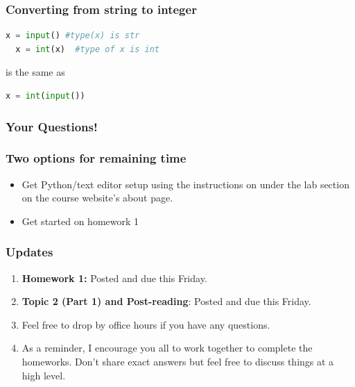 \documentclass{beamer}
\begin{document}
%
%
%
\begin{frame}[fragile]
  \frametitle{Converting from string to integer}
  \begin{lstlisting}[language=Python]
  x = input() #type(x) is str
  x = int(x)  #type of x is int
  \end{lstlisting}
  is the same as
  \begin{lstlisting}[language=Python]
  x = int(input()) 
  \end{lstlisting}
\end{frame}

\begin{frame}
  \frametitle{Your Questions!}
\end{frame}

\begin{frame}
  \frametitle{Two options for remaining time}
  \begin{itemize}
    \item Get Python/text editor setup using the instructions on under the lab section on the course website's about page.
    \item Get started on homework 1
  \end{itemize}
\end{frame}

\begin{frame}
  \frametitle{Updates}
  \begin{enumerate}
    \item \textbf{Homework 1:} Posted and due this Friday.
    \item \textbf{Topic 2 (Part 1) and Post-reading}: Posted and due this Friday.
    \item Feel free to drop by office hours if you have any questions.
    \item As a reminder, I encourage you all to work together to complete the homeworks. Don't share exact answers but feel free to discuss things at a high level.
  \end{enumerate}
\end{frame}
\end{document}
